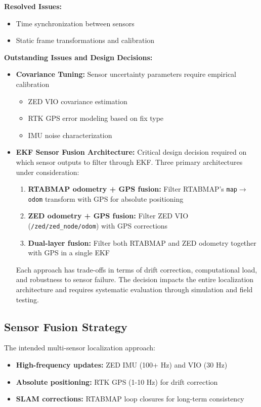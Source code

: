 \textbf{Resolved Issues:}
\begin{itemize}
    \item Time synchronization between sensors
    \item Static frame transformations and calibration
\end{itemize}

\textbf{Outstanding Issues and Design Decisions:}
\begin{itemize}
    \item \textbf{Covariance Tuning:} Sensor uncertainty parameters require empirical calibration
    \begin{itemize}
        \item ZED VIO covariance estimation
        \item RTK GPS error modeling based on fix type
        \item IMU noise characterization
    \end{itemize}

    \item \textbf{EKF Sensor Fusion Architecture:} Critical design decision required on which sensor outputs to filter through EKF. Three primary architectures under consideration:
    \begin{enumerate}
        \item \textbf{RTABMAP odometry + GPS fusion:} Filter RTABMAP's \texttt{map}$\rightarrow$\texttt{odom} transform with GPS for absolute positioning
        \item \textbf{ZED odometry + GPS fusion:} Filter ZED VIO (\texttt{/zed/zed\_node/odom}) with GPS corrections
        \item \textbf{Dual-layer fusion:} Filter both RTABMAP and ZED odometry together with GPS in a single EKF
    \end{enumerate}
    Each approach has trade-offs in terms of drift correction, computational load, and robustness to sensor failure. The decision impacts the entire localization architecture and requires systematic evaluation through simulation and field testing.
\end{itemize}

\subsection{Sensor Fusion Strategy}
The intended multi-sensor localization approach:
\begin{itemize}
    \item \textbf{High-frequency updates:} ZED IMU (100+ Hz) and VIO (30 Hz)
    \item \textbf{Absolute positioning:} RTK GPS (1-10 Hz) for drift correction
    \item \textbf{SLAM corrections:} RTABMAP loop closures for long-term consistency
\end{itemize}

